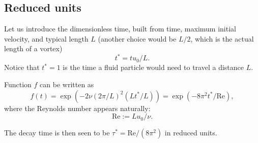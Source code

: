 \subsection{Reduced units}

Let us introduce the dimensionless time, built from time, maximum
initial velocity, and typical length $L$ (another choice would be
$L/2$, which is the actual length of a vortex)
\[
  t^*= t u_0 / L.
\]
Notice that $ t^*=1$ is the time a fluid particle would need to travel
a distance $L$.

Function $f$ can be written as
\[
  f(t)= \exp(-2\nu (2\pi/L)^2 (L t^* / L) ) = \exp(-8 \pi^2 t^* / \mathrm{Re}) ,
\]
%
where the Reynolds number appears naturally:
%
\[
  \mathrm{Re} := L u_0 / \nu .
\]

The decay time is then seen to be $ \tau^*=\mathrm{Re}/(8\pi^2)$ in
reduced units.



